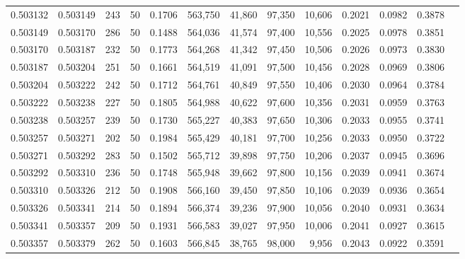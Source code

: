 \begin{tabular}{rrrrrrrrrrrrr}
0.503132 & 0.503149 & 243 &  50 &                                     0.1706 & 563,750 &  41,860 &  97,350 &  10,606 & 0.2021 & 0.0982 & 0.3878 \\
0.503149 & 0.503170 & 286 &  50 &                                     0.1488 & 564,036 &  41,574 &  97,400 &  10,556 & 0.2025 & 0.0978 & 0.3851 \\
0.503170 & 0.503187 & 232 &  50 &                                     0.1773 & 564,268 &  41,342 &  97,450 &  10,506 & 0.2026 & 0.0973 & 0.3830 \\
0.503187 & 0.503204 & 251 &  50 &                                     0.1661 & 564,519 &  41,091 &  97,500 &  10,456 & 0.2028 & 0.0969 & 0.3806 \\
0.503204 & 0.503222 & 242 &  50 &                                     0.1712 & 564,761 &  40,849 &  97,550 &  10,406 & 0.2030 & 0.0964 & 0.3784 \\
0.503222 & 0.503238 & 227 &  50 &                                     0.1805 & 564,988 &  40,622 &  97,600 &  10,356 & 0.2031 & 0.0959 & 0.3763 \\
0.503238 & 0.503257 & 239 &  50 &                                     0.1730 & 565,227 &  40,383 &  97,650 &  10,306 & 0.2033 & 0.0955 & 0.3741 \\
0.503257 & 0.503271 & 202 &  50 &                                     0.1984 & 565,429 &  40,181 &  97,700 &  10,256 & 0.2033 & 0.0950 & 0.3722 \\
0.503271 & 0.503292 & 283 &  50 &                                     0.1502 & 565,712 &  39,898 &  97,750 &  10,206 & 0.2037 & 0.0945 & 0.3696 \\
0.503292 & 0.503310 & 236 &  50 &                                     0.1748 & 565,948 &  39,662 &  97,800 &  10,156 & 0.2039 & 0.0941 & 0.3674 \\
0.503310 & 0.503326 & 212 &  50 &                                     0.1908 & 566,160 &  39,450 &  97,850 &  10,106 & 0.2039 & 0.0936 & 0.3654 \\
0.503326 & 0.503341 & 214 &  50 &                                     0.1894 & 566,374 &  39,236 &  97,900 &  10,056 & 0.2040 & 0.0931 & 0.3634 \\
0.503341 & 0.503357 & 209 &  50 &                                     0.1931 & 566,583 &  39,027 &  97,950 &  10,006 & 0.2041 & 0.0927 & 0.3615 \\
0.503357 & 0.503379 & 262 &  50 &                                     0.1603 & 566,845 &  38,765 &  98,000 &   9,956 & 0.2043 & 0.0922 & 0.3591 \\

\end{tabular}
